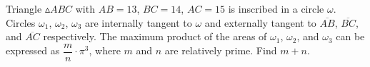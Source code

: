 Triangle $\vartriangle ABC$ with $AB = 13$, $BC = 14$, $AC = 15$ is inscribed in a circle $\omega$. Circles $\omega_1$, $\omega_2$, $\omega_3$ are internally tangent to $\omega$ and externally tangent to $\overline{AB}$, $\overline{BC}$, and $\overline{AC}$ respectively. The maximum product of the areas of $\omega_1$, $\omega_2$, and $\omega_3$ can be expressed as $\dfrac{m}{n} \cdot \pi^3$, where $m$ and $n$ are relatively prime. Find $m + n$.
